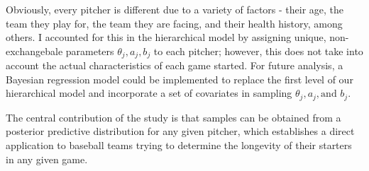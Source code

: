 \documentclass{article}
\begin{document}
Obviously, every pitcher is different due to a variety of factors - their age, the team they play for, the team they are facing, and their health history, among others. I accounted for this in the hierarchical model by assigning unique, non-exchangebale parameters $\theta_j, a_j, b_j$ to each pitcher; however, this does not take into account the actual characteristics of each game started. For future analysis, a Bayesian regression model could be implemented to replace the first level of our hierarchical model and incorporate a set of covariates in sampling $\theta_j, a_j, \text{and } b_j$.

The central contribution of the study is that samples can be obtained from a posterior predictive distribution for any given pitcher, which establishes a direct application to baseball teams trying to determine the longevity of their starters in any given game.
\end{document}

